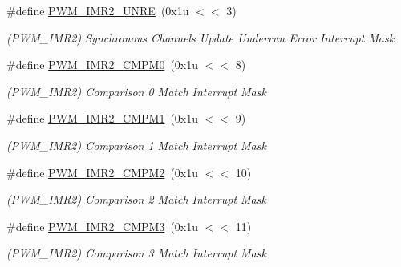 \begin{DoxyCompactItemize}
\mbox{\label{group__SAMV71__PWM_ga85e7cc43a764e203d90db792459a49c7}} 
\#define \mbox{\hyperlink{group__SAMV71__PWM_ga85e7cc43a764e203d90db792459a49c7}{P\+W\+M\+\_\+\+I\+M\+R2\+\_\+\+U\+N\+RE}}~(0x1u $<$$<$ 3)
\begin{DoxyCompactList}\small\item\em (P\+W\+M\+\_\+\+I\+M\+R2) Synchronous Channels Update Underrun Error Interrupt Mask \end{DoxyCompactList}\item 
\mbox{\label{group__SAMV71__PWM_ga37414bfbc6978c6fe9b00fa217792ca5}} 
\#define \mbox{\hyperlink{group__SAMV71__PWM_ga37414bfbc6978c6fe9b00fa217792ca5}{P\+W\+M\+\_\+\+I\+M\+R2\+\_\+\+C\+M\+P\+M0}}~(0x1u $<$$<$ 8)
\begin{DoxyCompactList}\small\item\em (P\+W\+M\+\_\+\+I\+M\+R2) Comparison 0 Match Interrupt Mask \end{DoxyCompactList}\item 
\mbox{\label{group__SAMV71__PWM_ga3ea81ef42b970526d8bbd56cb4b5d423}} 
\#define \mbox{\hyperlink{group__SAMV71__PWM_ga3ea81ef42b970526d8bbd56cb4b5d423}{P\+W\+M\+\_\+\+I\+M\+R2\+\_\+\+C\+M\+P\+M1}}~(0x1u $<$$<$ 9)
\begin{DoxyCompactList}\small\item\em (P\+W\+M\+\_\+\+I\+M\+R2) Comparison 1 Match Interrupt Mask \end{DoxyCompactList}\item 
\mbox{\label{group__SAMV71__PWM_ga9c940d51b51456920df0a6a30166023d}} 
\#define \mbox{\hyperlink{group__SAMV71__PWM_ga9c940d51b51456920df0a6a30166023d}{P\+W\+M\+\_\+\+I\+M\+R2\+\_\+\+C\+M\+P\+M2}}~(0x1u $<$$<$ 10)
\begin{DoxyCompactList}\small\item\em (P\+W\+M\+\_\+\+I\+M\+R2) Comparison 2 Match Interrupt Mask \end{DoxyCompactList}\item 
\mbox{\label{group__SAMV71__PWM_ga2106152052701756a91b5189fb60dcea}} 
\#define \mbox{\hyperlink{group__SAMV71__PWM_ga2106152052701756a91b5189fb60dcea}{P\+W\+M\+\_\+\+I\+M\+R2\+\_\+\+C\+M\+P\+M3}}~(0x1u $<$$<$ 11)
\begin{DoxyCompactList}\small\item\em (P\+W\+M\+\_\+\+I\+M\+R2) Comparison 3 Match Interrupt Mask \end{DoxyCompactList}\item 
$$
\end{DoxyCompactItemize}
